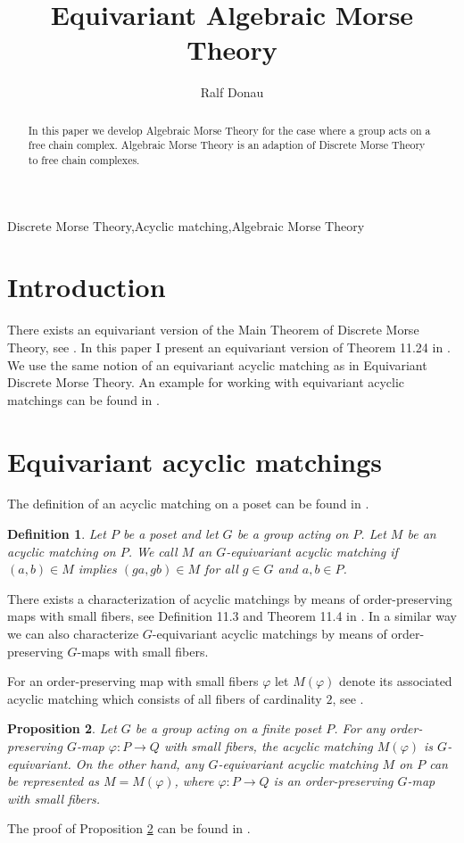 \documentclass{elsarticle}
\newtheorem{df}{Definition}[section]
\newtheorem{prop}[df]{Proposition}
\begin{document}
\begin{frontmatter}
\title{Equivariant Algebraic Morse Theory}
\author[ruelle]{Ralf Donau}
\address[ruelle]{Fachbereich Mathematik, Universit\"at Bremen, Bibliothekstra\ss e 1, 28359 Bremen, Germany}
\begin{abstract}
In this paper we develop Algebraic Morse Theory for the case where a group acts on a free chain complex. Algebraic Morse Theory is an adaption of Discrete Morse Theory to free chain complexes.
\end{abstract}
\begin{keyword}
Discrete Morse Theory\sep Acyclic matching\sep Algebraic Morse Theory
\end{keyword}
\end{frontmatter}
\section{Introduction}
There exists an equivariant version of the Main Theorem of Discrete Morse Theory, see \cite{freij}. In this paper I present an equivariant version of Theorem 11.24 in \cite[Chapter 11.3]{buch}. We use the same notion of an equivariant acyclic matching as in Equivariant Discrete Morse Theory. An example for working with equivariant acyclic matchings can be found in \cite{donau3}.
\section{Equivariant acyclic matchings}
The definition of an acyclic matching on a poset can be found in \cite{clmap,buch}.
\begin{df}
Let $P$ be a poset and let $G$ be a group acting on $P$. Let $M$ be an acyclic matching on $P$. We call $M$ an \emph{$G$-equivariant acyclic matching} if $(a,b)\in M$ implies $(ga,gb)\in M$ for all $g\in G$ and $a,b\in P$.
\end{df}
There exists a characterization of acyclic matchings by means of order-preserving maps with small fibers, see Definition 11.3 and Theorem 11.4 in \cite[Chapter 11]{buch}. In a similar way we can also characterize $G$-equivariant acyclic matchings by means of order-preserving $G$-maps with small fibers.

For an order-preserving map with small fibers $\varphi$ let $M(\varphi)$ denote its associated acyclic matching which consists of all fibers of cardinality $2$, see \cite[Chapter 11]{buch}.
\begin{prop}
\label{smallfibers}
Let $G$ be a group acting on a finite poset $P$. For any order-preserving $G$-map $\varphi:P\longrightarrow Q$ with small fibers, the acyclic matching $M(\varphi)$ is $G$-equivariant. On the other hand, any $G$-equivariant acyclic matching $M$ on $P$ can be represented as $M=M(\varphi)$, where $\varphi:P\longrightarrow Q$ is an order-preserving $G$-map with small fibers.
\end{prop}
The proof of Proposition \ref{smallfibers} can be found in \cite{donau3}.
\end{document}
